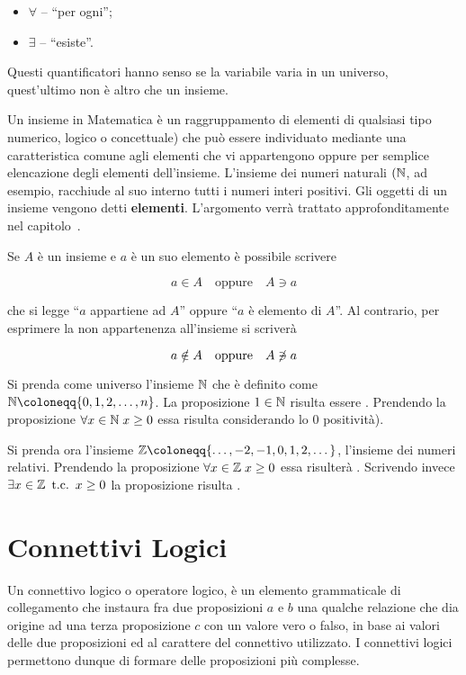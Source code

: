 \begin{itemize}
    \item \(\forall\) – ``per ogni'';
    \item \(\exists\) – ``esiste''.
\end{itemize}

Questi quantificatori hanno senso se la variabile varia in un universo,
quest'ultimo non è altro che un insieme.

Un insieme in Matematica è un raggruppamento di elementi di qualsiasi tipo
numerico, logico o concettuale) che può essere individuato mediante una
caratteristica comune agli elementi che vi appartengono oppure per semplice
elencazione degli elementi dell'insieme. L'insieme dei numeri naturali \((\mathbb{N}\),
ad esempio, racchiude al suo interno tutti i numeri interi positivi. Gli
oggetti di un insieme vengono detti \textbf{elementi}. L'argomento verrà
trattato approfonditamente nel capitolo~.

Se \(A\) è un insieme e \(a\) è un suo elemento è possibile scrivere

\[
    a \in A \quad \text{oppure} \quad A \ni a
\]

che si legge ``\(a\) appartiene ad \(A\)'' oppure ``\(a\) è elemento di \(A\)''.
Al contrario, per esprimere la non appartenenza all'insieme si scriverà

\[
    a \notin A \quad \text{oppure} \quad A \centernot\ni a
\]

\begin{example}
    Si prenda come universo l'insieme \(\mathbb{N}\) che è definito come
    \(\N \coloneqq \{0,1,2,\dotsc,n\}\).
    La proposizione \(1 \in \mathbb{N}\) risulta essere \true[l]. Prendendo la
    proposizione \(\forall x \in \mathbb{N} \; x \geq 0\) essa risulta \true{}
    considerando lo \(0\) positività).

    Si prenda ora l'insieme \(\Z \coloneqq \{\dotsc,-2,-1,0,1,2,\dotsc\}\), l'insieme dei numeri relativi. Prendendo la proposizione \(\forall x \in \mathbb{Z} \; x \geq 0\) essa risulterà \false{}. Scrivendo invece \(\exists x \in \mathbb{Z} \mathrm{\hspace*{.5em}t.c.\hspace*{.5em}} x \geq 0\) la proposizione risulta \true[l].
\end{example}


\section{Connettivi Logici}\label{sec:connettivi_logici}
Un connettivo logico o operatore logico, è un elemento grammaticale di collegamento che instaura fra due proposizioni \(a\) e \(b\) una qualche relazione che dia origine ad una terza proposizione \(c\) con un valore vero o falso, in base ai valori delle due proposizioni 
ed al carattere del connettivo utilizzato. I connettivi logici permettono dunque di formare delle proposizioni più complesse.

